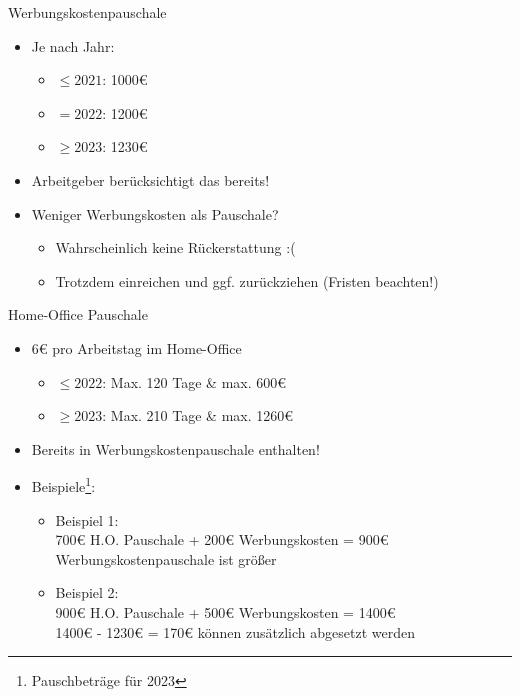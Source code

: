 \documentclass{beamer}
\begin{document}
			\begin{frame}{Werbungskostenpauschale}
				\begin{itemize}
					\item Je nach Jahr:
					\begin{itemize}
						\item $\leq2021$: 1000€
						\item $=2022$: 1200€
						\item $\geq2023$: 1230€
					\end{itemize}
					\item Arbeitgeber berücksichtigt das bereits!
					\item Weniger Werbungskosten als Pauschale?
					\begin{itemize}
						\item Wahrscheinlich keine Rückerstattung :(
						\item Trotzdem einreichen und ggf. zurückziehen (Fristen beachten!)
					\end{itemize}
				\end{itemize}
			\end{frame}
		
			\begin{frame}{Home-Office Pauschale}
				\begin{itemize}
					\item 6€ pro Arbeitstag im Home-Office
					\begin{itemize}
						\item $\leq2022$: Max. 120 Tage \& max. 600€
						\item $\geq2023$: Max. 210 Tage \& max. 1260€
					\end{itemize}
					\item Bereits in Werbungskostenpauschale enthalten!\pause
					\item Beispiele\footnote{Pauschbeträge für 2023}:
					\begin{itemize}
						\item Beispiel 1:\\
						700€ H.O. Pauschale + 200€ Werbungskosten = 900€\\
						Werbungskostenpauschale ist größer\pause
						\item Beispiel 2:\\
						900€ H.O. Pauschale + 500€ Werbungskosten = 1400€\\
						1400€ - 1230€ = 170€ können zusätzlich abgesetzt werden
					\end{itemize}
				\end{itemize}
			\end{frame}
		
\end{document}
